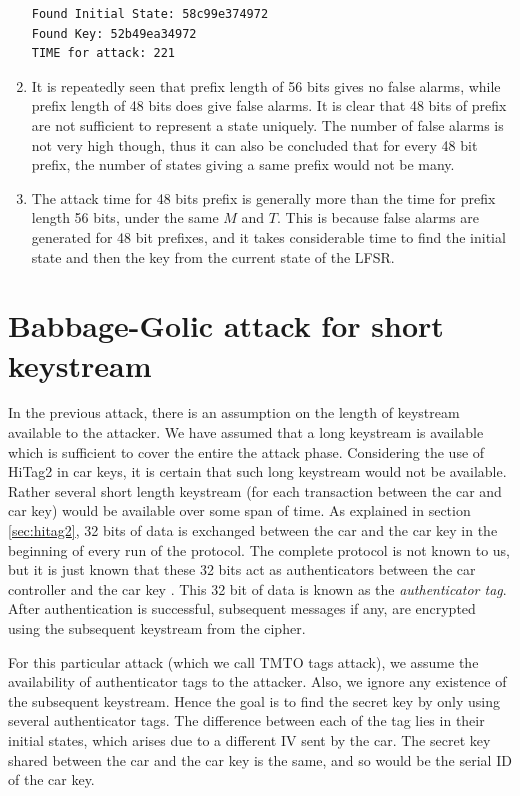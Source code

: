 \begin{enumerate}
\begin{lstlisting}[frame=tb]
Found Initial State: 58c99e374972
Found Key: 52b49ea34972
TIME for attack: 221
\end{lstlisting}

\item It is repeatedly seen that prefix length of 56 bits gives no false alarms, while prefix length of 48 bits does give false alarms. It is clear that 48 bits of prefix are not sufficient to represent a state uniquely. The number of false alarms is not very high though, thus it can also be concluded that for every 48 bit prefix, the number of states giving a same prefix would not be many.
 
\item The attack time for 48 bits prefix is generally more than the time for prefix length 56 bits, under the same $M$ and $T$. This is because false alarms are generated for 48 bit prefixes, and it takes considerable time to find the initial state and then the key from the current state of the LFSR.

\end{enumerate}

\section{Babbage-Golic attack for short keystream}
\label{sec:bg-tags-attack}

In the previous attack, there is an assumption on the length of keystream available to the attacker. We have assumed that a long keystream is available which is sufficient to cover the entire the attack phase. Considering the use of HiTag2 in car keys, it is certain that such long keystream would not be available. Rather several short length keystream (for each transaction between the car and car key) would be available over some span of time. As explained in section \ref{sec:hitag2}, 32 bits of data is exchanged between the car and the car key in the beginning of every run of the protocol. The complete protocol is not known to us, but it is just known that these 32 bits act as authenticators between the car controller and the car key \cite{email-ruptor} \cite{hitag2-code}. This 32 bit of data is known as the \emph{authenticator tag}. After authentication is successful, subsequent messages if any, are encrypted using the subsequent keystream from the cipher.

For this particular attack (which we call TMTO tags attack), we assume the availability of authenticator tags to the attacker. Also, we ignore any existence of the subsequent keystream. Hence the goal is to find the secret key by only using several authenticator tags. The difference between each of the tag lies in their initial states, which arises due to a different IV sent by the car. The secret key shared between the car and the car key is the same, and so would be the serial ID of the car key.

